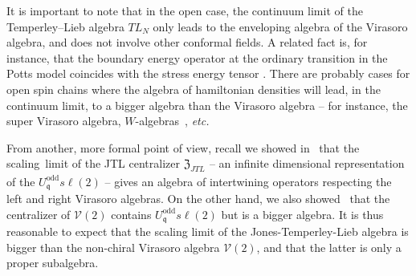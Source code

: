 \documentclass[11pt]{article}
\newcommand{\scal}{scaling~}
\newcommand{\q}{\mathfrak{q}}
\newcommand{\TL}[1]{TL_{#1}}
\newcommand{\JTL}[1]{JTL_{#1}}
\newcommand{\LQGodd}{U^{\text{odd}}_{\q} s\ell(2)}
\newcommand{\VirN}{\boldsymbol{\mathcal{V}}}
\newcommand{\cent}{\mathfrak{Z}}
\newcommand{\centJTL}{\cent_{\JTL{}}}
\theoremstyle{definition}
\begin{document}
  It is important to note that in the open case, the continuum limit of  the Temperley--Lieb algebra $\TL{N}$ only leads to the enveloping algebra of the Virasoro algebra, and does not involve
  other conformal fields. A related fact is, for instance, that the boundary energy operator at the ordinary transition in the Potts model coincides with the stress energy tensor \cite{BatchelorCardy}. There are probably cases for open spin chains where the algebra of hamiltonian densities will lead, in the continuum limit, to a bigger algebra than the Virasoro algebra -- for instance, the super Virasoro algebra, $W$-algebras~\cite{GST}, {\it etc.}



From another, more formal point of view, recall we  showed in~\cite[Sec. 5.2]{GRS1} that the \scal limit of the JTL centralizer
$\centJTL$ -- an infinite dimensional representation of the $\LQGodd$ -- gives
an algebra of intertwining operators respecting the left and right
Virasoro algebras. On the other hand, we also showed~\cite{GRS1} that the
centralizer of $\VirN(2)$ contains $\LQGodd$ but is a bigger algebra.
It is thus reasonable to expect that the scaling limit  of the Jones-Temperley-Lieb algebra
 is bigger than the non-chiral Virasoro algebra $\VirN(2)$, and that the
 latter  is only a proper subalgebra.
\end{document}
